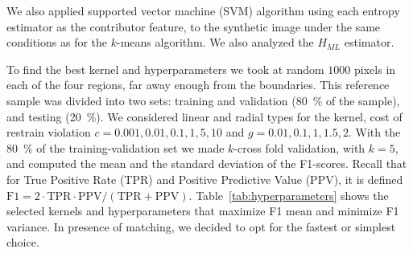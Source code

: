 \documentclass[journal]{IEEEtran}
\begin{document}

We also applied supported vector machine (SVM) algorithm using each entropy estimator as the contributor feature, to the synthetic image under the same conditions as for the $k$-means algorithm. We also analyzed the $H_{ML}$ estimator.

To find the best kernel and hyperparameters we took at random $1000$ pixels in each of the four regions, far away enough from the boundaries. 
This reference sample was divided into two sets:
training and validation (\SI{80}{\percent} of the sample), and
testing (\SI{20}{\percent}). 
We considered linear and radial types for the kernel, cost of restrain violation $c=0.001, 0.01, 0.1, 1, 5, 10$ and $g=0.01, 0.1, 1, 1.5, 2$. 
With the \SI{80}{\percent} of the training-validation set we made $k$-cross fold validation, with $k=5$, and computed the mean and the standard deviation of the F1-scores. Recall that for True Positive Rate (TPR) and Positive Predictive Value (PPV), it is defined $\textrm{F1}=2 \cdot \textrm{TPR} \cdot \textrm{PPV} / (\textrm{TPR} + \textrm{PPV})$.
Table~\ref{tab:hyperparameters} shows the selected kernels and hyperparameters that maximize F1 mean and minimize F1 variance. 
In presence of matching, we decided to opt for the fastest or simplest choice.



\end{document}
